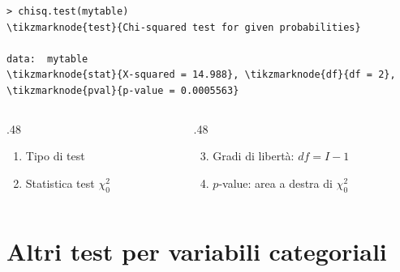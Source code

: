 \documentclass[
  ignorenonframetext,
  compress, aspectratio=149]{beamer}
\begin{document}
\begin{frame}[fragile]{}
\label{section-11}
\begin{Verbatim}[commandchars=\\\{\}, fontsize=\scriptsize, frame=single, framesep=2mm]
> chisq.test(mytable)
\tikzmarknode{test}{Chi-squared test for given probabilities}

data:  mytable
\tikzmarknode{stat}{X-squared = 14.988}, \tikzmarknode{df}{df = 2}, \tikzmarknode{pval}{p-value = 0.0005563}
\end{Verbatim}

\vspace{-3mm}
\begin{columns}[T]
\begin{column}{.48\textwidth}
\footnotesize
\begin{enumerate}
  \item Tipo di test
  \item Statistica test $\chi^2_0$
\end{enumerate}
\end{column}
\begin{column}{.48\textwidth}
\footnotesize
\begin{enumerate}
  \setcounter{enumi}{2}
  \item Gradi di libertà: $df = I - 1$
  \item $p$-value: area a destra di $\chi^2_0$
\end{enumerate}
\end{column}
\end{columns}
\end{frame}

\section{Altri test per variabili
categoriali}\label{altri-test-per-variabili-categoriali}
\end{document}
